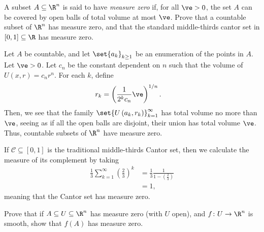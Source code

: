 \documentclass[10pt]{mypackage}
\begin{document}
\RaggedRight
\begin{problem}[Problem 1]
  A subset $A\subseteq \R^{n}$ is said to have \textit{measure zero} if, for all $\ve > 0$, the set $A$ can be covered by open balls of total volume at most $\ve$. Prove that a countable subset of $\R^{n}$ has measure zero, and that the standard middle-thirds cantor set in $[0,1]\subseteq \R$ has measure zero.
\end{problem}
\begin{solution}
  Let $A$ be countable, and let $\set{a_k}_{k\geq 1}$ be an enumeration of the points in $A$. Let $\ve > 0$. Let $c_{n}$ be the constant dependent on $n$ such that the volume of $U\left( x,r \right) = c_nr^{n}$. For each $k$, define
  \begin{align*}
    r_k &= \left( \frac{1}{2^{k}c_n} \ve \right)^{1/n}.
  \end{align*}
  Then, we see that the family $\set{U\left( a_k,r_k \right)}_{k=1}^{\infty}$ has total volume no more than $\ve$, seeing as if all the open balls are disjoint, their union has total volume $\ve$. Thus, countable subsets of $\R^{n}$ have measure zero.\newline

  If $\mathcal{C}\subseteq [0,1]$ is the traditional middle-thirds Cantor set, then we calculate the measure of its complement by taking
  \begin{align*}
    \frac{1}{3}\sum_{k=1}^{\infty} \left( \frac{2}{3} \right)^{k} &= \frac{1}{3} \frac{1}{1-\left( \frac{2}{3} \right)}\\
                                                                  &= 1,
  \end{align*}
  meaning that the Cantor set has measure zero.
\end{solution}
\begin{problem}[Problem 2]
  Prove that if $A\subseteq U\subseteq \R^{n}$ has measure zero (with $U$ open), and $f\colon U\rightarrow \R^{n}$ is smooth, show that $f(A)$ has measure zero.
\end{problem}
\end{document}
